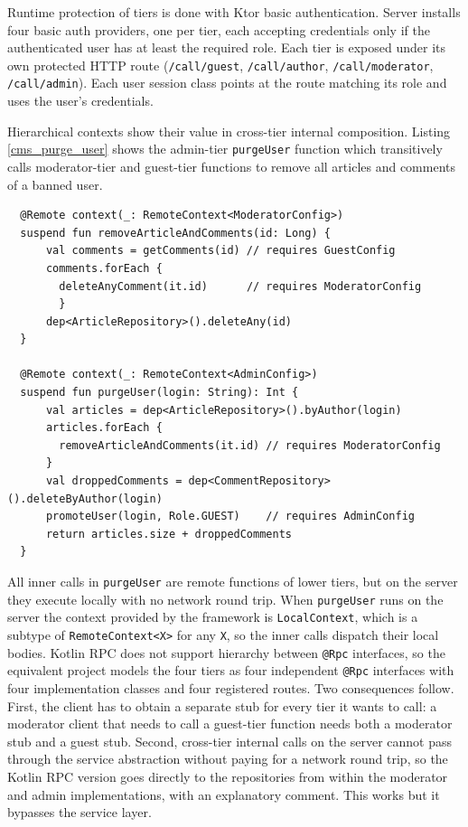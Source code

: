 \documentclass[a4paper,11pt,oneside]{article}
\newcommand{\kotlini}[1]{\texttt{#1}}
\begin{document}
Runtime protection of tiers is done with Ktor basic authentication. Server installs four basic
auth providers, one per tier, each accepting credentials only if the authenticated user has at
least the required role. Each tier is exposed under its own protected HTTP route
(\kotlini{/call/guest}, \kotlini{/call/author}, \kotlini{/call/moderator},
\kotlini{/call/admin}). Each user session class points at the route matching its role and uses
the user's credentials.

Hierarchical contexts show their value in cross-tier internal composition. Listing
\ref{cms_purge_user} shows the admin-tier \kotlini{purgeUser} function which transitively calls
moderator-tier and guest-tier functions to remove all articles and comments of a banned user.

\begin{listing}[!h]
  \begin{verbatim}
  @Remote context(_: RemoteContext<ModeratorConfig>)
  suspend fun removeArticleAndComments(id: Long) {
      val comments = getComments(id) // requires GuestConfig
      comments.forEach { 
        deleteAnyComment(it.id)      // requires ModeratorConfig
        } 
      dep<ArticleRepository>().deleteAny(id)
  }

  @Remote context(_: RemoteContext<AdminConfig>)
  suspend fun purgeUser(login: String): Int {
      val articles = dep<ArticleRepository>().byAuthor(login)
      articles.forEach { 
        removeArticleAndComments(it.id) // requires ModeratorConfig
      }
      val droppedComments = dep<CommentRepository>().deleteByAuthor(login)
      promoteUser(login, Role.GUEST)    // requires AdminConfig
      return articles.size + droppedComments
  }
  \end{verbatim}
  \caption{Cross-tier internal composition in CMS}\label{cms_purge_user}
\end{listing}

All inner calls in \kotlini{purgeUser} are remote functions of lower tiers, but on the server
they execute locally with no network round trip. When \kotlini{purgeUser} runs on the server
the context provided by the framework is \kotlini{LocalContext}, which is a subtype of
\kotlini{RemoteContext<X>} for any \kotlini{X}, so the inner calls dispatch their local bodies.
Kotlin RPC does not support hierarchy between \kotlini{@Rpc} interfaces, so the equivalent
project models the four tiers as four independent \kotlini{@Rpc} interfaces with four
implementation classes and four registered routes. Two consequences follow. First, the client
has to obtain a separate stub for every tier it wants to call: a moderator client that needs to
call a guest-tier function needs both a moderator stub and a guest stub. Second, cross-tier
internal calls on the server cannot pass through the service abstraction without paying for a
network round trip, so the Kotlin RPC version goes directly to the repositories from within
the moderator and admin implementations, with an explanatory comment. This works but it
bypasses the service layer.
\end{document}
